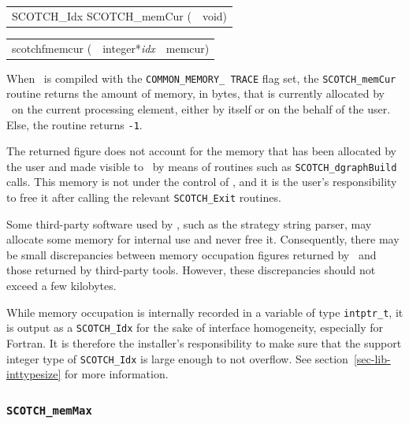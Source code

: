 \begin{itemize}
\progsyn

{\tt\begin{tabular}{l@{}l}
SCOTCH\_Idx SCOTCH\_memCur ( & void)
\end{tabular}}

{\tt\begin{tabular}{l@{}ll}
scotchfmemcur ( & integer*{\it idx} & memcur) \\

\end{tabular}}

\progdes

When \scotch\ is compiled with the {\tt COMMON\_\lbt MEMORY\_\lbt
TRACE} flag set, the {\tt SCOTCH\_memCur} routine returns the amount
of memory, in bytes, that is currently allocated by \scotch\ on the
current processing element, either by itself or on the behalf of the
user. Else, the routine returns {\tt -1}.

The returned figure does not account for the memory that has been
allocated by the user and made visible to \scotch\ by means of
routines such as {\tt SCOTCH\_\lbt dgraph\lbt Build} calls. This
memory is not under the control of \scotch, and it is the user's
responsibility to free it after calling the relevant
{\tt SCOTCH\_\lbt *\lbt Exit} routines.

Some third-party software used by \scotch, such as the strategy string
parser, may allocate some memory for internal use and never free it.
Consequently, there may be small discrepancies between memory
occupation figures returned by \scotch\ and those returned by
third-party tools. However, these discrepancies should not exceed a
few kilobytes.

While memory occupation is internally recorded in a variable of type
{\tt intptr\_\lbt t}, it is output as a {\tt SCOTCH\_\lbt Idx} for the
sake of interface homogeneity, especially for Fortran. It is therefore
the installer's responsibility to make sure that the support integer
type of {\tt SCOTCH\_\lbt Idx} is large enough to not overflow. See
section~\ref{sec-lib-inttypesize} for more information.
\end{itemize}

\subsubsection{{\tt SCOTCH\_memMax}}

